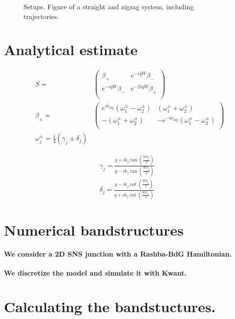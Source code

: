 \documentclass[english, twocolumn, 10pt, aps, superscriptaddress, floatfix, prb, citeautoscript]{revtex4-1}
\renewcommand{\comment}[2]{#2}
\renewcommand{\comment}{\paragraph}
\begin{document}
\begin{figure}[!htb]
\caption{Setups. Figure of a straight and zigzag system, including trajectories.
\label{fig:setup}}
\end{figure}


\section{Analytical estimate}
\begin{align}
    &S = 
    &\left(
    \begin{array}{cc}
    \beta_+ & e^{-i q W} \beta_-\\
    e^{-i q W} \beta_- & e^{-2 i q W} \beta_+\\
    \end{array}
    \right) 
    \\
    &\beta_\pm = &\left(
    \begin{array}{rr}
    e^{i \nu_{\arg}}\left(\omega^\pm_1 - \omega^\pm_2\right) & (\omega^\pm _1 + \omega^\pm _2)\\
    -(\omega^\pm _1 + \omega^\pm _2) & - e^{-i \nu _{\arg }} \left(\omega^\pm _1 - \omega^\pm _2\right)\\
    \end{array}
    \right)\\
    &\omega^\pm_j = \frac{1}{4} \left(\gamma _{j} \pm \delta _{j}\right)
\end{align}

\begin{align}
    \gamma_j = \frac{q+i k_{j} \tan \left(\frac{W k_{j}}{2}\right)}{q-i k_{j} \tan \left(\frac{W k_{j}}{2}\right)} \\
    \delta_j = \frac{q-i k_{j} \cot \left(\frac{W k_{j}}{2}\right)}{q+i k_{j} \cot \left(\frac{W k_{\pm}}{2}\right)}
\end{align}
\section{Numerical bandstructures}

\comment{We consider a 2D SNS junction with a Rashba-BdG Hamiltonian.}

\comment{We discretize the model and simulate it with Kwant.}

\section{Calculating the bandstuctures.}
\end{document}
